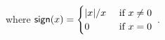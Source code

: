 \begin{proposition}
\begin{comment}
\begin{align}
\begin{split}\label{eq:edges-inference}
  \forall b\in\PHpredecgene{a}, \forall s \in \{ +, - \}, \\
  b \xrightarrow{t+1} a \in \hat{E}_s \Longleftrightarrow\ & \exists g \in X(a), b \in g,
  \exists \sigma \in \textstyle\prod_{c\in g \cup \{ a \}} \PHl_c, \\
    &\qquad \{ b_t, b_{t+1} \} \subset \PHl_b \wedge b_t \in \sigma,\\
    &\qquad \exists a_j \in \irB_a(\sigma), \exists a_k \in \irB_a(\sigma\{b_{t+1}\}), \\
    &\qquad s = \f{sign}(k - a)
\end{split}
\end{align}
\begin{align}
\begin{split}\label{eq:edges-inference-auto}
  \forall s \in \{ +, - \}, \quad\qquad\qquad \\
  a \xrightarrow{t+1} a \in \hat{E}_s \Longleftrightarrow\ & \exists g \in X(a), \exists b \in g,
  \exists \sigma \in \textstyle\prod_{c\in g \cup \{ a \}} \PHl_c, \\
    &\qquad \{ b_t, b_{t+1} \} \subset \PHl_b \wedge b_t \in \sigma,\\
    &\qquad \exists a_j \in \irB_a(\sigma), \exists a_k \in \irB_a(\sigma\{b_{t+1}\}), \\
    &\qquad s = \f{sign}(a_k - a_j)
\end{split}
\end{align}
\begin{align}
\begin{split}\label{eq:edges-inference-noreg}
  \forall s \in \{ +, - \}, \quad\qquad\qquad \\
  a \xrightarrow{t+1} a \in \hat{E}_s \Longleftrightarrow\ & \reg{a} = \emptyset \wedge \{ a_t, a_{t+1} \} \subset \PHl_a, \\
    &\qquad \exists a_j \in \irB_a(\PHetat{a_t}), \exists a_k \in \irB_a(\PHetat{a_{t+1}}), \\
    &\qquad s = \f{sign}(a_k - a_j)
\end{split}
\end{align}
\end{comment}
where $\mathsf{sign}(x) = \begin{cases}|x|/x & \text{ if $x \neq 0$} \\ 0 & \text{ if $x = 0$}\end{cases}$ \enspace.
\end{proposition}

